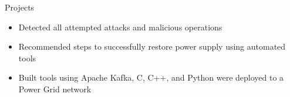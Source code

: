 \documentclass[]{mcdowellcv}
\begin{document}
\begin{cvsection}{Projects}
\begin{cvsubsection}{}{}{}
\begin{itemize}
        \begin{itemize}
          \item Detected all attempted attacks and malicious operations 
          \item Recommended steps to successfully restore power supply using automated tools
          \item Built tools using Apache Kafka, C, C++, and Python were deployed to a Power Grid network
        \end{itemize}



			\end{itemize}
		\end{cvsubsection}
	\end{cvsection}
\end{document}
